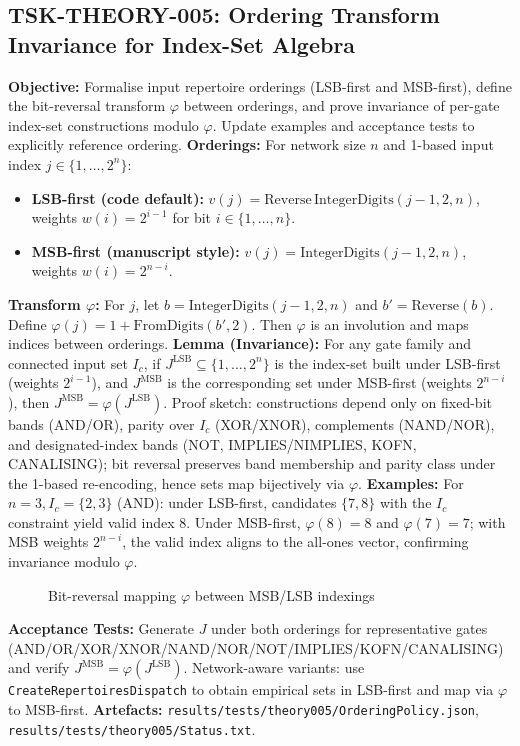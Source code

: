 \documentclass{article}
\begin{document}
\subsection{TSK-THEORY-005: Ordering Transform Invariance for Index-Set Algebra}
\textbf{Objective:} Formalise input repertoire orderings (LSB-first and MSB-first), define the bit-reversal transform \(\varphi\) between orderings, and prove invariance of per-gate index-set constructions modulo \(\varphi\). Update examples and acceptance tests to explicitly reference ordering.
\textbf{Orderings:} For network size \(n\) and 1-based input index \(j\in\{1,\dots,2^n\}\):
\begin{itemize}
 \item \textbf{LSB-first (code default):} \(v(j)=\mathrm{Reverse}\,\mathrm{IntegerDigits}(j-1,2,n)\), weights \(w(i)=2^{i-1}\) for bit \(i\in\{1,\dots,n\}\).
 \item \textbf{MSB-first (manuscript style):} \(v(j)=\mathrm{IntegerDigits}(j-1,2,n)\), weights \(w(i)=2^{n-i}\).
\end{itemize}
\textbf{Transform \(\varphi\):} For \(j\), let \(b=\mathrm{IntegerDigits}(j-1,2,n)\) and \(b'=\mathrm{Reverse}(b)\). Define \(\varphi(j)=1+\mathrm{FromDigits}(b',2)\). Then \(\varphi\) is an involution and maps indices between orderings.
\textbf{Lemma (Invariance):} For any gate family and connected input set \(I_c\), if \(J^{\mathrm{LSB}}\subseteq\{1,\dots,2^n\}\) is the index-set built under LSB-first (weights \(2^{i-1}\)), and \(J^{\mathrm{MSB}}\) is the corresponding set under MSB-first (weights \(2^{n-i}\)), then \(J^{\mathrm{MSB}}=\varphi(J^{\mathrm{LSB}})\). Proof sketch: constructions depend only on fixed-bit bands (AND/OR), parity over \(I_c\) (XOR/XNOR), complements (NAND/NOR), and designated-index bands (NOT, IMPLIES/NIMPLIES, KOFN, CANALISING); bit reversal preserves band membership and parity class under the 1-based re-encoding, hence sets map bijectively via \(\varphi\).
\textbf{Examples:} For \(n=3, I_c=\{2,3\}\) (AND): under LSB-first, candidates \(\{7,8\}\) with the \(I_c\) constraint yield valid index \(8\). Under MSB-first, \(\varphi(8)=8\) and \(\varphi(7)=7\); with MSB weights \(2^{n-i}\), the valid index aligns to the all-ones vector, confirming invariance modulo \(\varphi\).
\begin{figure}[h]
\centering
{}
\caption{Bit-reversal mapping \(\varphi\) between MSB/LSB indexings}
\end{figure}
\textbf{Acceptance Tests:} Generate \(J\) under both orderings for representative gates (AND/OR/XOR/XNOR/NAND/NOR/NOT/IMPLIES/KOFN/CANALISING) and verify \(J^{\mathrm{MSB}}=\varphi(J^{\mathrm{LSB}})\). Network-aware variants: use \texttt{CreateRepertoiresDispatch} to obtain empirical sets in LSB-first and map via \(\varphi\) to MSB-first.
\textbf{Artefacts:} \texttt{results/tests/theory005/OrderingPolicy.json}, \texttt{results/tests/theory005/Status.txt}.
\end{document}
